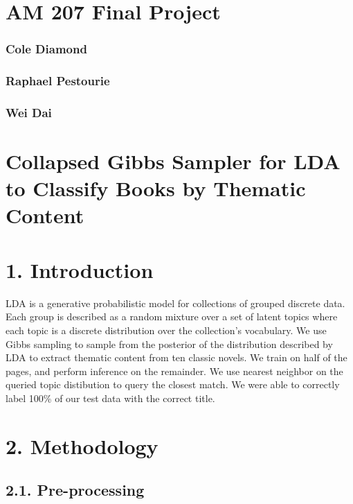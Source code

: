 \documentclass{article}
\begin{document}
    \section{AM 207 Final Project}\label{am-207-final-project}

\subsubsection{Cole Diamond}\label{cole-diamond}

\subsubsection{Raphael Pestourie}\label{raphael-pestourie}

\subsubsection{Wei Dai}\label{wei-dai}

    \section{Collapsed Gibbs Sampler for LDA to Classify Books by Thematic
Content}\label{collapsed-gibbs-sampler-for-lda-to-classify-books-by-thematic-content}

\section{1. Introduction}\label{introduction}

LDA is a generative probabilistic model for collections of grouped
discrete data. Each group is described as a random mixture over a set of
latent topics where each topic is a discrete distribution over the
collection's vocabulary. We use Gibbs sampling to sample from the
posterior of the distribution described by LDA to extract thematic
content from ten classic novels. We train on half of the pages, and
perform inference on the remainder. We use nearest neighbor on the
queried topic distibution to query the closest match. We were able to
correctly label 100\% of our test data with the correct title.

\section{2. Methodology}\label{methodology}

\subsection{2.1. Pre-processing}\label{pre-processing}
\end{document}
